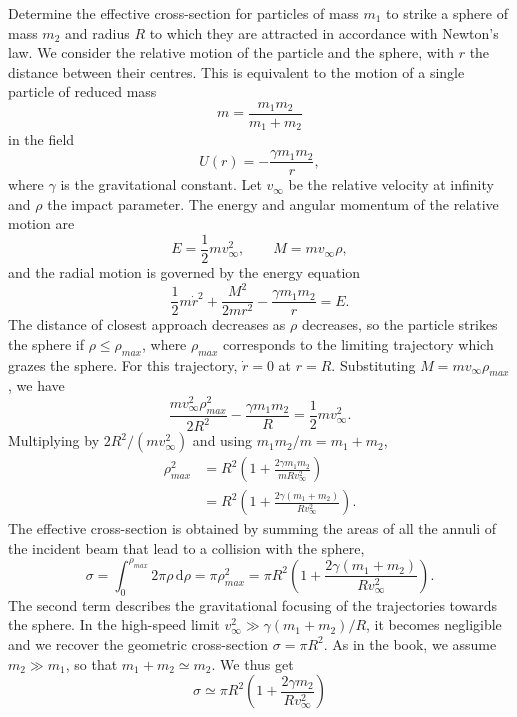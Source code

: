 \begin{problem}[title={Capture by a gravitating sphere}]
{
Determine the effective cross-section for particles of mass $m_1$ to strike a sphere of mass $m_2$ and radius $R$ to which they are attracted in accordance with Newton's law.
}
{
We consider the relative motion of the particle and the sphere, with $r$ the distance between their centres. This is equivalent to the motion of a single particle of reduced mass
\begin{equation*}
    m = \frac{m_1m_2}{m_1+m_2}
\end{equation*}
in the field
\begin{equation*}
    U(r) = -\frac{\gamma m_1m_2}{r},
\end{equation*}
where $\gamma$ is the gravitational constant. Let $v_\infty$ be the relative velocity at infinity and $\rho$ the impact parameter. The energy and angular momentum of the relative motion are
\begin{equation*}
    E = \frac{1}{2}mv_\infty^2, \qquad M = mv_\infty\rho,
\end{equation*}
and the radial motion is governed by the energy equation
\begin{equation*}
    \frac{1}{2}m\dot{r}^2 + \frac{M^2}{2mr^2} - \frac{\gamma m_1m_2}{r} = E.
\end{equation*}
The distance of closest approach decreases as $\rho$ decreases, so the particle strikes the sphere if $\rho \leq \rho_{max}$, where $\rho_{max}$ corresponds to the limiting trajectory which grazes the sphere. For this trajectory, $\dot{r} = 0$ at $r = R$. Substituting $M = mv_\infty\rho_{max}$, we have
\begin{equation*}
    \frac{mv_\infty^2\rho_{max}^2}{2R^2} - \frac{\gamma m_1m_2}{R} = \frac{1}{2}mv_\infty^2.
\end{equation*}
Multiplying by $2R^2/(mv_\infty^2)$ and using $m_1m_2/m = m_1 + m_2$,
\begin{align*}
    \rho_{max}^2 &= R^2\left( 1 + \frac{2\gamma m_1m_2}{mRv_\infty^2} \right) \\
    &= R^2\left( 1 + \frac{2\gamma(m_1+m_2)}{Rv_\infty^2} \right).
\end{align*}
The effective cross-section is obtained by summing the areas of all the annuli of the incident beam that lead to a collision with the sphere,
\begin{equation*}
    \sigma = \int_0^{\rho_{max}} 2\pi\rho\,\mathrm{d}\rho = \pi\rho_{max}^2 = \pi R^2\left( 1 + \frac{2\gamma(m_1+m_2)}{Rv_\infty^2} \right).
\end{equation*}
The second term describes the gravitational focusing of the trajectories towards the sphere. In the high-speed limit $v_\infty^2 \gg \gamma(m_1+m_2)/R$, it becomes negligible and we recover the geometric cross-section $\sigma = \pi R^2$. As in the book, we assume $m_2 \gg m_1$, so that $m_1+m_2 \simeq m_2$. We thus get
}
{
\begin{equation*}
    \sigma \simeq \pi R^2\left( 1 + \frac{2\gamma m_2}{Rv_\infty^2} \right)
\end{equation*}
}
\end{problem}

